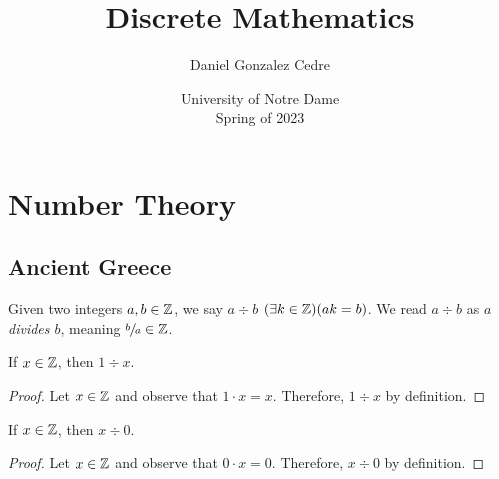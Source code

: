 





\title{Discrete Mathematics}
\author{Daniel Gonzalez Cedre}
\date{University of Notre Dame \\ Spring of 2023}
\maketitle

\setcounter{chapter}{6}
\chapter{Number Theory}

\section{Ancient Greece}

\begin{definition}[Divisibility]
    Given two integers $a, b \in \mathbb{Z}$,
    we say $a \div b$ \iffbydefn $\pn*{\exists k \in \Z}\pn*{ak = b}$.
    We read $a \div b$ as \emph{$a$ divides $b$}, meaning $\sfrac{b}{a} \in \mathbb{Z}$.
\end{definition}

\begin{lemma}
    If $x \in \mathbb{Z}$, then $1 \div x$.
\end{lemma}
\begin{proof}
    Let $x \in \mathbb{Z}$ and observe that $1 \cdot x = x$.
    Therefore, $1 \div x$ by definition.
\end{proof}

\begin{lemma}
    If $x \in \mathbb{Z}$, then $x \div 0$.
\end{lemma}
\begin{proof}
    Let $x \in \mathbb{Z}$ and observe that $0 \cdot x = 0$.
    Therefore, $x \div 0$ by definition.
\end{proof}

